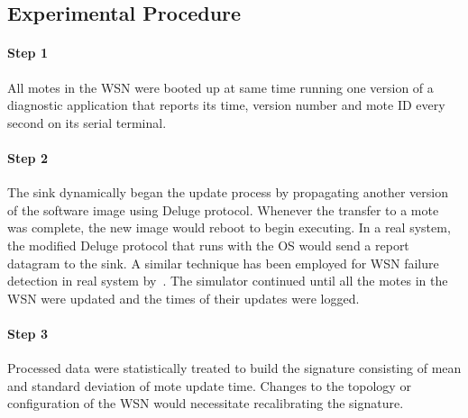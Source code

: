 \documentclass{CRPITStyle}
\renewcommand{\cite}{\citep}
\begin{document}
\subsection*{Experimental Procedure}
\label{subsec:proc}
\paragraph*{Step 1} All motes in the WSN were booted up at same time running one version of a diagnostic application that reports its time, version number and mote ID every second on its serial terminal. 
\paragraph*{Step 2}  The sink dynamically began the update process by propagating another version of the software image using Deluge protocol. %
Whenever the transfer to a mote was complete, the new image would  reboot to begin executing.
In a real system, the modified Deluge protocol that runs with the OS would send a report datagram to the sink.
A similar technique has been employed  for WSN failure detection in real system by~\cite{Kam14}.
The simulator continued until all the motes in the WSN were updated and the times of their updates were logged. 
\paragraph*{Step 3}  Processed data  were statistically treated to build the signature consisting of mean and standard deviation of  mote update time.
Changes to the topology or configuration of the WSN would necessitate recalibrating the signature.
\end{document}
